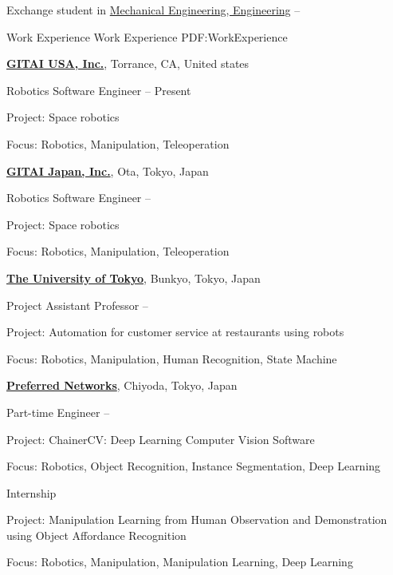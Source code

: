 \documentclass[letterpaper,MMMyyyy,nonstopmode]{simpleresumecv}
\begin{document}
\begin{Body}
\Gap
Exchange student in
\href{http://www.t.u-tokyo.ac.jp/en/foe}
{Mechanical Engineering, Engineering}
\hfill
{} --


\Section
{Work Experience}
{Work Experience}
{PDF:WorkExperience}

\Gap
\Entry
\href{https://gitai.tech/}
{\textbf{GITAI USA, Inc.}},
Torrance, CA, United states
\Gap


\Gap
Robotics Software Engineer
\hfill
{} --
Present
\begin{Detail}
Project:
Space robotics
\par
Focus:
Robotics, Manipulation, Teleoperation
\end{Detail}
\Gap

\Gap
\Entry
\href{https://gitai.tech/}
{\textbf{GITAI Japan, Inc.}},
Ota, Tokyo, Japan
\Gap


\Gap
Robotics Software Engineer
\hfill
{} --
\begin{Detail}
Project:
Space robotics
\par
Focus:
Robotics, Manipulation, Teleoperation
\end{Detail}
\Gap

\Gap
\Entry
\href{https://www.u-tokyo.ac.jp/en/}
{\textbf{The University of Tokyo}},
Bunkyo, Tokyo, Japan
\Gap

\Gap
Project Assistant Professor
\hfill
{} --
\begin{Detail}
Project:
Automation for customer service at restaurants using robots
\par
Focus:
Robotics, Manipulation, Human Recognition, State Machine
\end{Detail}
\Gap

\Gap
\Entry
\href{https://www.preferred.jp/en/}
{\textbf{Preferred Networks}},
Chiyoda, Tokyo, Japan
\Gap

\Gap
Part-time Engineer
\hfill
{} --
\begin{Detail}
Project:
ChainerCV: Deep Learning Computer Vision Software
\par
Focus:
Robotics, Object Recognition, Instance Segmentation, Deep Learning 
\end{Detail}
\Gap

\Gap
Internship
\hfill
{}
\begin{Detail}
Project:
Manipulation Learning from Human Observation and Demonstration using Object Affordance Recognition
\par
Focus:
Robotics, Manipulation, Manipulation Learning, Deep Learning
\end{Detail}
\Gap


\end{Body}
\end{document}
